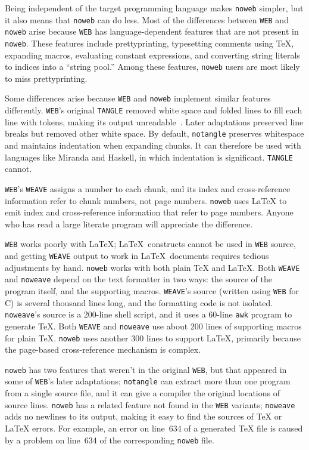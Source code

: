 Being independent of the target programming language makes {\tt noweb}
simpler, but it also means that {\tt noweb} can do less.
Most of the differences between {\tt WEB} and {\tt noweb} arise
because {\tt WEB} has language-dependent features that are not present
in \verb+noweb+.
These features include
prettyprinting,
typesetting comments using {\TeX},
expanding macros,
evaluating constant expressions,
and
converting string literals to indices into a ``string pool.''
Among these features,
\verb+noweb+ users are most likely to miss prettyprinting.


Some differences arise because {\tt WEB} and \verb+noweb+ implement
similar features differently.
{\tt WEB}'s  original {\tt TANGLE} removed white space and folded
lines to fill each line with tokens,
making its output unreadable~\cite[Chapter~4, Figure~3]{knuth:literate:book}.
Later adaptations preserved line breaks but removed other white space.
By default, \verb+notangle+ preserves whitespace and maintains
indentation when expanding chunks.
It can therefore be used with
languages like Miranda and
Haskell, in which indentation is significant.
{\tt TANGLE} cannot.

{\tt WEB}'s {\tt WEAVE} assigns a number to each chunk, and its index
and cross-reference
information refer to chunk numbers, not page numbers.
\verb+noweb+ uses {\LaTeX} to emit index and cross-reference information that
refer to page numbers.
Anyone who has read a large literate program will
appreciate the difference.

{\tt WEB} works poorly with \LaTeX; \LaTeX\ constructs cannot
be used in {\tt WEB} source, and getting {\tt WEAVE} output
to work in \LaTeX\ documents requires tedious adjustments by hand.
\verb+noweb+ works with both plain {\TeX} and {\LaTeX}.
Both {\tt WEAVE} and {\tt noweave} depend on the text formatter in two
ways: the source of the program itself, and the supporting macros.
{\tt WEAVE}'s source (written using {\tt WEB} for C) is
several thousand lines long, and the formatting code is not isolated.
{\tt noweave}'s source is a 200-line shell script, and it uses a
60-line {\tt awk} program to generate {\TeX}.
Both
{\tt WEAVE} and {\tt noweave} use about 200 lines of supporting macros
for plain {\TeX}.
\verb+noweb+ uses another 300 lines to support {\LaTeX}, primarily
because the page-based cross-reference mechanism is complex.

{\tt noweb} has
two features that weren't in the original {\tt WEB}, but that appeared in
some of {\tt WEB}'s later adaptations;
{\tt notangle} can extract more than one program from
a single source file, and it can give a compiler the original locations
of source lines.
{\tt noweb} has a related feature not found in the {\tt WEB} variants;
{\tt noweave} adds no newlines to its output, making it easy to find
the sources of {\TeX} or {\LaTeX} errors.
For example, an error on line~634 of a generated
{\TeX} file is caused by a problem on line~634 of the
corresponding {\tt noweb} file.

